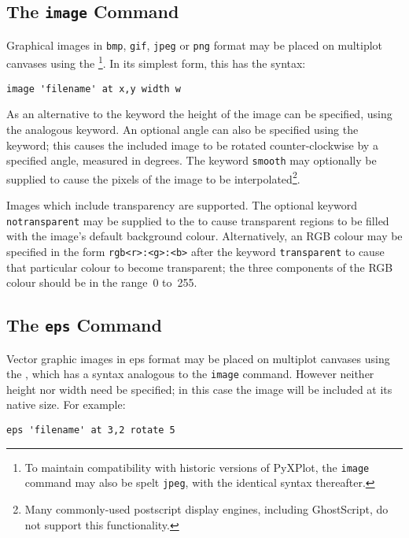 
\subsection{The {\tt image} Command}

Graphical images in {\tt bmp}, {\tt gif}, {\tt jpeg} or {\tt png} format may be
placed on multiplot canvases using the \footnote{To maintain
compatibility with historic versions of PyXPlot, the {\tt image} command may
also be spelt {\tt jpeg}, with the identical syntax thereafter.}. In its
simplest form, this has the syntax:
\begin{verbatim}
image 'filename' at x,y width w
\end{verbatim}

As an alternative to the  keyword the height of the image can be
specified, using the analogous  keyword.  An optional angle can
also be specified using the  keyword; this causes the included
image to be rotated counter-clockwise by a specified angle, measured in
degrees.  The keyword {\tt smooth} may optionally be supplied to cause the
pixels of the image to be interpolated\footnote{Many commonly-used postscript
display engines, including GhostScript, do not support this functionality.}.

Images which include transparency are supported. The optional keyword {\tt
notransparent} may be supplied to the  to cause transparent
regions to be filled with the image's default background colour. Alternatively,
an RGB colour may be specified in the form {\tt rgb<r>:<g>:<b>} after the
keyword {\tt transparent} to cause that particular colour to become
transparent; the three components of the RGB colour should be in the range~0 
to~255.

\subsection{The {\tt eps} Command}

Vector graphic images in eps format may be placed on multiplot canvases
using the , which has a syntax analogous to the {\tt image}
command.  However neither height nor width need be specified; in this case the
image will be included at its native size.  For example:

\begin{verbatim}
eps 'filename' at 3,2 rotate 5
\end{verbatim}

